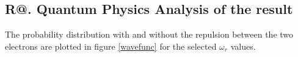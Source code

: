 \documentclass[%
reprint,
amsmath,amssymb,
aps,
]{revtex4-1}
\makeatletter
\newcommand*{\rom}[1]{\expandafter\@slowromancap\romannumeral #1@}
\makeatother
\begin{document}
\subsection*{R\rom{4}. Quantum Physics Analysis of the result}\noindent 
The probability distribution with and without the repulsion between the two electrons are plotted in figure \ref{wavefunc} for the selected $\omega_r$ values. \\ \newpage 

\begin{figure}
	\centering
	 \\ 
	

\end{figure}
\end{document}
